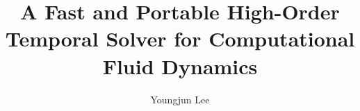 




\title{A Fast and Portable High-Order Temporal Solver for Computational Fluid Dynamics}
\author{Youngjun Lee}
\deanlinethree{}

\begin{frontmatter}
\maketitle

\copyrightpage

\tableofcontents

\listoffigures

\listoftables

\begin{abstract}

\end{abstract}

\begin{dedication}
\vspace*{\fill}
\begin{center}
\end{center}
\vspace*{\fill}
\end{dedication}

\begin{acknowledgements}

\end{acknowledgements}

\end{frontmatter}















\nocite{*}

\singlespacing

\doublespacing


